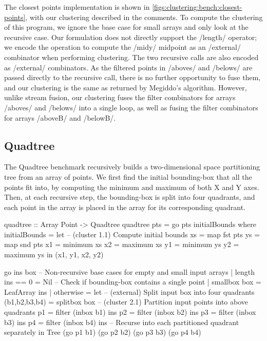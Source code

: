 The closest points implementation is shown in \cref{figs:clustering:bench:closest-points}, with our clustering described in the comments.
To compute the clustering of this program, we ignore the base case for small arrays and only look at the recursive case.
Our formulation does not directly support the \Hs/length/ operator; we encode the operation to compute the \Hs/midy/ midpoint as an \Hs/external/ combinator when performing clustering.
The two recursive calls are also encoded as \Hs/external/ combinators.
As the filtered points in \Hs/aboves/ and \Hs/belows/ are passed directly to the recursive call, there is no further opportunity to fuse them, and our clustering is the same as returned by Megiddo's algorithm.
However, unlike stream fusion, our clustering fuses the filter combinators for arrays \Hs/aboves/ and \Hs/belows/ into a single loop, as well as fusing the filter combinators for arrays \Hs/aboveB/ and \Hs/belowB/.


\subsection{Quadtree}
The Quadtree benchmark recursively builds a two-dimensional space partitioning tree from an array of points.
We first find the initial bounding-box that all the points fit into, by computing the minimum and maximum of both X and Y axes.
Then, at each recursive step, the bounding-box is split into four quadrants, and each point in the array is placed in the array for its corresponding quadrant.

\begin{haskell}[float,caption=Quadtree benchmark,label=figs:clustering:bench:quadtree]
quadtree :: Array Point -> Quadtree
quadtree pts = go pts initialBounds
 where
  initialBounds
   = let -- (cluster 1.1) Compute initial bounds
         xs = map fst pts
         ys = map snd pts
         x1 = minimum xs
         x2 = maximum xs
         y1 = minimum ys
         y2 = maximum ys
     in (x1, y1, x2, y2)

  go ins box
   -- Non-recursive base cases for empty and small input arrays
   | length ins == 0
   = Nil
   -- Check if bounding-box contains a single point
   | smallbox box
   = LeafArray ins
   | otherwise
   = let -- (external) Split input box into four quadrants
         (b1,b2,b3,b4)    = splitbox box
         -- (cluster 2.1) Partition input points into above quadrants
         p1               = filter (inbox b1) ins
         p2               = filter (inbox b2) ins
         p3               = filter (inbox b3) ins
         p4               = filter (inbox b4) ins
         -- Recurse into each partitioned quadrant separately
     in  Tree (go p1 b1) (go p2 b2) (go p3 b3) (go p4 b4)
\end{haskell}

